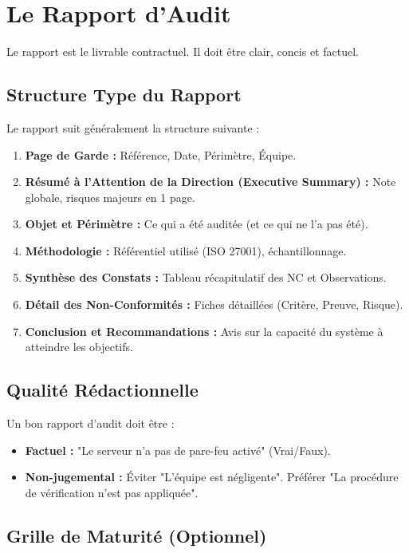 \section{Le Rapport d'Audit}

Le rapport est le livrable contractuel. Il doit être clair, concis et factuel.

\subsection{Structure Type du Rapport}

Le rapport suit généralement la structure suivante :

\begin{enumerate}
    \item \textbf{Page de Garde :} Référence, Date, Périmètre, Équipe.
    \item \textbf{Résumé à l'Attention de la Direction (Executive Summary) :} Note globale, risques majeurs en 1 page.
    \item \textbf{Objet et Périmètre :} Ce qui a été auditée (et ce qui ne l'a pas été).
    \item \textbf{Méthodologie :} Référentiel utilisé (ISO 27001), échantillonnage.
    \item \textbf{Synthèse des Constats :} Tableau récapitulatif des NC et Observations.
    \item \textbf{Détail des Non-Conformités :} Fiches détaillées (Critère, Preuve, Risque).
    \item \textbf{Conclusion et Recommandations :} Avis sur la capacité du système à atteindre les objectifs.
\end{enumerate}

\subsection{Qualité Rédactionnelle}

Un bon rapport d'audit doit être :
\begin{itemize}
    \item \textbf{Factuel :} "Le serveur n'a pas de pare-feu activé" (Vrai/Faux).
    \item \textbf{Non-jugemental :} Éviter "L'équipe est négligente". Préférer "La procédure de vérification n'est pas appliquée".
\end{itemize}

\subsection{Grille de Maturité (Optionnel)}

